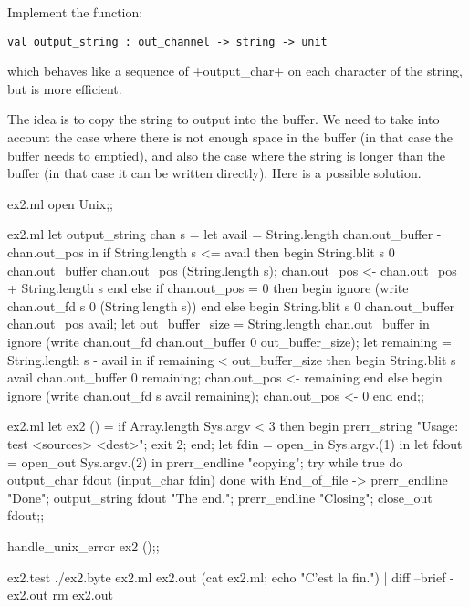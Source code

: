 \begin{exercise} 
Implement the function:
%
\begin{lstlisting}
val output_string : out_channel -> string -> unit
\end{lstlisting}
%
which behaves like a sequence of \ml+output_char+ on each 
character of the string, but is more efficient.
\enlargethispage{2\baselineskip} %
\end{exercise}
\begin{answer}
The idea is to copy the string to output into the buffer. We need to
take into account the case where there is not enough space in the
buffer (in that case the buffer needs to emptied), and also the case
where the string is longer than the buffer (in that case it can 
be written directly). Here is a possible solution.
%
\begin{codefile}{ex2.ml}
open Unix;;
\end{codefile}
%
\begin{listingcodefile}{ex2.ml}
let output_string chan s =
  let avail = String.length chan.out_buffer - chan.out_pos in
  if String.length s <= avail then begin
    String.blit s 0 chan.out_buffer chan.out_pos (String.length s);
    chan.out_pos <- chan.out_pos + String.length s
  end
  else if chan.out_pos = 0 then begin
    ignore (write chan.out_fd s 0 (String.length s))
  end
  else begin
    String.blit s 0 chan.out_buffer chan.out_pos avail;
    let out_buffer_size = String.length chan.out_buffer in
    ignore (write chan.out_fd chan.out_buffer 0 out_buffer_size);
    let remaining = String.length s - avail in
    if remaining < out_buffer_size then begin
      String.blit s avail chan.out_buffer 0 remaining;
      chan.out_pos <- remaining
    end else begin
      ignore (write chan.out_fd s avail remaining);
      chan.out_pos <- 0
    end
  end;;
\end{listingcodefile}
%
\begin{codefile}{ex2.ml}
let ex2 () = 
  if Array.length Sys.argv < 3 then begin 
     prerr_string "Usage: test <sources> <dest>"; 
     exit 2;
  end;
  let fdin = open_in Sys.argv.(1) in
  let fdout = open_out Sys.argv.(2) in
  prerr_endline "copying";
  try while true do output_char fdout (input_char fdin) done
  with End_of_file -> 
   prerr_endline "Done";
   output_string fdout "The end.\n";
   prerr_endline "Closing";
   close_out fdout;;

handle_unix_error ex2 ();;
\end{codefile}
%
\begin{codefile}{ex2.test}
./ex2.byte ex2.ml ex2.out
(cat ex2.ml; echo "C'est la fin.") | diff --brief - ex2.out
rm ex2.out
\end{codefile}
\end{answer}


